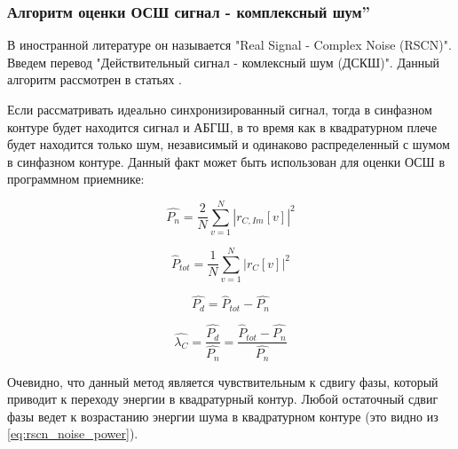 \subsubsection{Алгоритм оценки ОСШ
 сигнал - комплексный шум\textquotedblright}
\label{sssec:rscn}

В иностранной литературе он называется "Real Signal - Complex Noise (RSCN)". Введем перевод
"Действительный сигнал - комлексный шум (ДСКШ)".
Данный алгоритм рассмотрен в статьях \cite{badke_rscn, presti_insidegnss, presti_ieee}.

Если рассматривать идеально синхронизированный сигнал, тогда в синфазном контуре будет
находится сигнал и АБГШ, в то время как в квадратурном плече будет находится только шум,
независимый и одинаково распределенный с шумом в синфазном контуре. Данный факт может
быть использован для оценки ОСШ в программном приемнике:
\begin{center}
\begin{equation}
	\label{eq:rscn_noise_power}
	\hat{P_n} = \frac{2}{N}\sum^N_{v=1}|r_{C,Im}[v]|^2
\end{equation}
\end{center}

\begin{center}
\begin{equation}
	\label{eq:rscn_total_power}
	\hat{P}_{tot} = \frac{1}{N}\sum^N_{v=1}|r_{C}[v]|^2
\end{equation}
\end{center}

\begin{center}
\begin{equation}
	\label{eq:rscn_data_power}
	\hat{P_d} = \hat{P}_{tot} - \hat{P_n}
\end{equation}
\end{center}

\begin{center}
\begin{equation}
	\label{eq:rscn_snr}
	\hat{\lambda_C} = \frac{\hat{P_d}}{\hat{P_n}} = \frac{\hat{P}_{tot} - \hat{P_n}}{\hat{P_n}} 
\end{equation}
\end{center}

Очевидно, что данный метод является чувствительным к сдвигу фазы, который приводит к переходу энергии
в квадратурный контур. Любой остаточный сдвиг фазы ведет к возрастанию энергии шума в квадратурном
контуре (это видно из \ref{eq:rscn_noise_power}).

